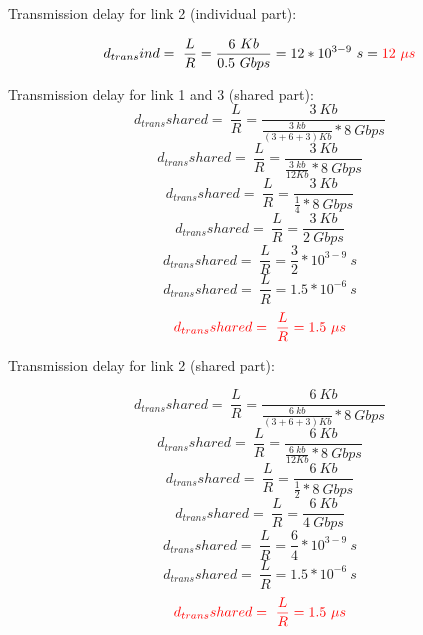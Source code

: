 \documentclass[12pt,a4paper]{article}
\begin{document}
Transmission delay for link 2 (individual part):

\begin{equation}
    d_{trans}{ind} =\ \frac{L}{R} = \frac{6\ Kb}{0.5\ Gbps} = 12 * 10 ^{3-9}\ s = \textcolor{red}{12\ \mu s}
\end{equation}

Transmission delay for link 1 and 3 (shared part):
\begin{equation}
    d_{trans}{shared} = \ \frac{L}{R} = \frac{3\ Kb}{\frac{3\ kb}{(3 + 6 + 3) Kb} * 8\ Gbps}
\end{equation}
\begin{equation}
    d_{trans}{shared} = \ \frac{L}{R} = \frac{3\ Kb}{\frac{3\ kb}{12 Kb} * 8\ Gbps}
\end{equation}
\begin{equation}
    d_{trans}{shared} = \ \frac{L}{R} = \frac{3\ Kb}{ \frac{1}{4}* 8\ Gbps}
\end{equation}
\begin{equation}
    d_{trans}{shared} = \ \frac{L}{R} = \frac{3\ Kb}{2\ Gbps}
\end{equation}
\begin{equation}
    d_{trans}{shared} = \ \frac{L}{R} = \frac{3}{2} * 10 ^{3 - 9}\ s
\end{equation}
\begin{equation}
    d_{trans}{shared} = \ \frac{L}{R} = 1.5 * 10 ^{-6}\ s
\end{equation}
\begin{equation}
    \textcolor{red}{d_{trans}{shared} = \ \frac{L}{R} = 1.5\ \mu s}
\end{equation}

Transmission delay for link 2 (shared part):

\begin{equation}
    d_{trans}{shared} = \ \frac{L}{R} = \frac{6\ Kb}{\frac{6\ kb}{(3 + 6 + 3) Kb} * 8\ Gbps}
\end{equation}
\begin{equation}
    d_{trans}{shared} = \ \frac{L}{R} = \frac{6\ Kb}{\frac{6\ kb}{12 Kb} * 8\ Gbps}
\end{equation}
\begin{equation}
    d_{trans}{shared} = \ \frac{L}{R} = \frac{6\ Kb}{ \frac{1}{2}* 8\ Gbps}
\end{equation}
\begin{equation}
    d_{trans}{shared} = \ \frac{L}{R} = \frac{6\ Kb}{4\ Gbps}
\end{equation}
\begin{equation}
    d_{trans}{shared} = \ \frac{L}{R} = \frac{6}{4} * 10 ^{3 - 9}\ s
\end{equation}
\begin{equation}
    d_{trans}{shared} = \ \frac{L}{R} = 1.5 * 10 ^{-6}\ s
\end{equation}
\begin{equation}
    \textcolor{red}{d_{trans}{shared} = \ \frac{L}{R} = 1.5\ \mu s}
\end{equation}
\end{document}
